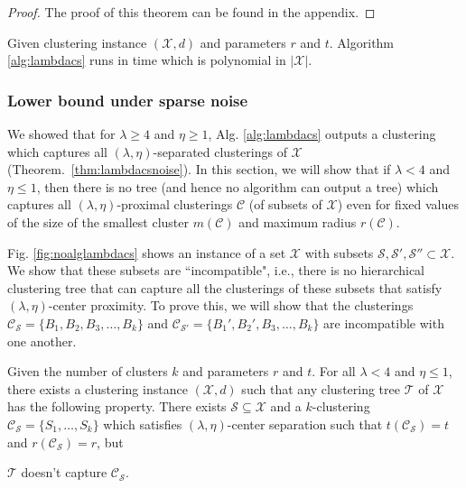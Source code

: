 \documentclass[anon,12pt]{colt2016} %
\newcommand{\mc}{\mathcal}
\begin{document}
\begin{proof}
The proof of this theorem can be found in the appendix.
\end{proof}

\begin{theorem}
\label{thm:alglambdacstime}
Given clustering instance $(\mc X, d)$ and parameters $r$ and $t$. Algorithm \ref{alg:lambdacs} runs in time which is polynomial in $|\mc X|$.
\end{theorem}


\subsubsection{Lower bound under sparse noise}
\label{section:lambdaLowerBoundSparse}
We showed that for $\lambda \ge 4$ and $\eta \ge 1$, Alg. \ref{alg:lambdacs} outputs a clustering which captures all $(\lambda, \eta)$-separated clusterings of $\mc X$ (Theorem.~\ref{thm:lambdacsnoise}). In this section, we will show that if $\lambda < 4$ and $\eta \le 1$, then there is no tree (and hence no algorithm can output a tree) which captures all $(\lambda, \eta)$-proximal clusterings $\mc C$ (of subsets of $\mc X$) even for fixed values of the size of the smallest cluster $m(\mc C)$ and maximum radius $r(\mc C)$.

Fig. \ref{fig:noalglambdacs} shows an instance of a set $\mc X$ with subsets $\mc S, \mc S' , \mc S'' \subset \mc X$. We show that these subsets are ``incompatible", i.e., there is no hierarchical clustering tree that can capture all the clusterings of these subsets that satisfy $(\lambda, \eta)$-center proximity. To prove this, we will show that the clusterings $\mc C_{\mc S} = \{B_1, B_2, B_3, \ldots, B_k\}$ and $\mc C_{\mc S'} = \{B_1', B_2', B_3, \ldots, B_k\}$ are incompatible with one another.



\begin{theorem}
\label{thm:noalglambdacs}
Given the number of clusters $k$ and parameters $r$ and $t$. For all $\lambda < 4$ and $\eta \le 1$, there exists a clustering instance $(\mc X , d)$ such that any clustering tree $\mc T$ of $\mc X$ has the following property. There exists $\mc S \subseteq \mc X$ and a $k$-clustering $\mc C_{\mc S} = \{S_1, \ldots, S_k\}$ which satisfies $(\lambda, \eta)$-center separation such that $t(\mc C_{\mc S}) = t$ and $r(\mc C_{\mc S}) = r$, but

$\mc T$ doesn't capture $\mc C_{\mc S}$.
\end{theorem}
\end{document}
